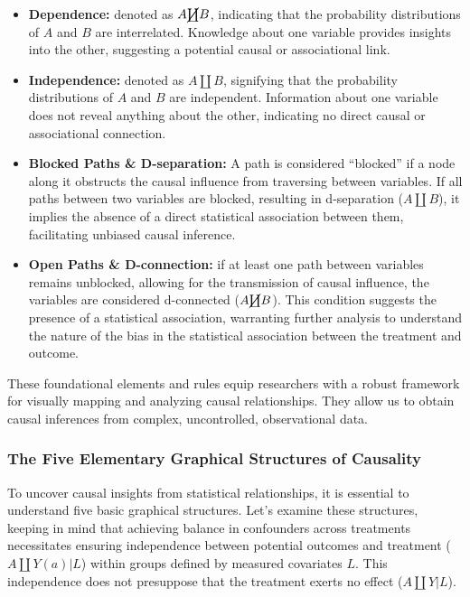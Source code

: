 \documentclass[
  singlecolumn]{article}
\begin{document}
\begin{itemize}
\item
  \textbf{Dependence:} denoted as \(A \cancel\coprod B\), indicating
  that the probability distributions of \(A\) and \(B\) are
  interrelated. Knowledge about one variable provides insights into the
  other, suggesting a potential causal or associational link.
\item
  \textbf{Independence:} denoted as \(A \coprod B\), signifying that the
  probability distributions of \(A\) and \(B\) are independent.
  Information about one variable does not reveal anything about the
  other, indicating no direct causal or associational connection.
\item
  \textbf{Blocked Paths \& D-separation:} A path is considered
  ``blocked'' if a node along it obstructs the causal influence from
  traversing between variables. If all paths between two variables are
  blocked, resulting in d-separation (\(A \coprod B\)), it implies the
  absence of a direct statistical association between them, facilitating
  unbiased causal inference.
\item
  \textbf{Open Paths \& D-connection:} if at least one path between
  variables remains unblocked, allowing for the transmission of causal
  influence, the variables are considered d-connected
  (\(A \cancel\coprod B\)). This condition suggests the presence of a
  statistical association, warranting further analysis to understand the
  nature of the bias in the statistical association between the
  treatment and outcome.
\end{itemize}

These foundational elements and rules equip researchers with a robust
framework for visually mapping and analyzing causal relationships. They
allow us to obtain causal inferences from complex, uncontrolled,
observational data.

\subsubsection{The Five Elementary Graphical Structures of
Causality}\label{sec-five-elementary}

To uncover causal insights from statistical relationships, it is
essential to understand five basic graphical structures. Let's examine
these structures, keeping in mind that achieving balance in confounders
across treatments necessitates ensuring independence between potential
outcomes and treatment (\(A\coprod Y(a)|L\)) within groups defined by
measured covariates \(L\). This independence does not presuppose that
the treatment exerts no effect (\(A\coprod Y |L\)).
\end{document}
